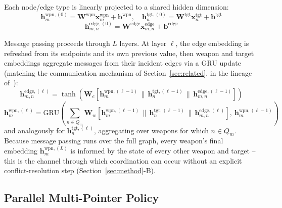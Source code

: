 \documentclass[smallcondensed]{svjour3}
\begin{document}
Each node/edge type is linearly projected to a shared hidden dimension:
\begin{equation}
\bm{h}_m^{\text{wpn},(0)} = \bm{W}^{\text{wpn}}\bm{x}_m^{\text{wpn}} + \bm{b}^{\text{wpn}}, \quad
\bm{h}_n^{\text{tgt},(0)} = \bm{W}^{\text{tgt}}\bm{x}_n^{\text{tgt}} + \bm{b}^{\text{tgt}}
\end{equation}
\begin{equation}
\bm{h}_{m,n}^{\text{edge},(0)} = \bm{W}^{\text{edge}}\bm{x}_{m,n}^{\text{edge}} + \bm{b}^{\text{edge}}
\end{equation}

Message passing proceeds through $L$ layers. At layer $\ell$, the edge embedding is refreshed from its endpoints and its own previous value, then weapon and target embeddings aggregate messages from their incident edges via a GRU update (matching the communication mechanism of Section~\ref{sec:related}, in the lineage of~\cite{sukhbaatar2016commnet,das2019tarmac}):
\begin{equation}
\bm{h}_{m,n}^{\text{edge},(\ell)} = \tanh\!\left(\bm{W}_e\left[\bm{h}_m^{\text{wpn},(\ell-1)} \,\|\, \bm{h}_n^{\text{tgt},(\ell-1)} \,\|\, \bm{h}_{m,n}^{\text{edge},(\ell-1)}\right]\right)
\end{equation}
\begin{equation}
\bm{h}_m^{\text{wpn},(\ell)} = \text{GRU}\!\left(\textstyle\sum_{n \in Q_m} \bm{W}_w\left[\bm{h}_m^{\text{wpn},(\ell-1)} \,\|\, \bm{h}_n^{\text{tgt},(\ell-1)} \,\|\, \bm{h}_{m,n}^{\text{edge},(\ell)}\right],\ \bm{h}_m^{\text{wpn},(\ell-1)}\right)
\end{equation}
and analogously for $\bm{h}_n^{\text{tgt},(\ell)}$, aggregating over weapons for which $n \in Q_m$. Because message passing runs over the full graph, every weapon's final embedding $\bm{h}_m^{\text{wpn},(L)}$ is informed by the state of every other weapon and target -- this is the channel through which coordination can occur without an explicit conflict-resolution step (Section~\ref{sec:method}-B).

\subsection{Parallel Multi-Pointer Policy}
\label{sec:parallel-decoder}
\end{document}
